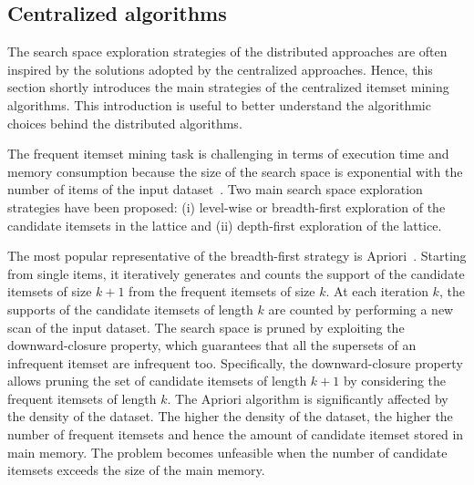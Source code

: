 \subsection{Centralized algorithms}
\label{centralized}
The search space exploration strategies of the distributed approaches are often inspired by the solutions adopted by the centralized approaches.
Hence, this section shortly introduces the main strategies of the centralized itemset mining algorithms. This introduction is useful to better understand the algorithmic choices behind the distributed algorithms.

The frequent itemset mining task is challenging in terms of execution time and memory consumption because the size of the search space is exponential with the number of items of the input dataset~\cite{goethals2003survey}.
Two main search space exploration strategies have been proposed: 
(i) level-wise or breadth-first exploration of the candidate itemsets in the lattice and 
(ii) depth-first exploration of the lattice.

The most popular representative of the breadth-first strategy is Apriori~\cite{apriori}. Starting from single items, it iteratively generates and counts the support of the candidate itemsets of size $k+1$ from the frequent itemsets of size $k$. At each iteration $k$, the supports of the candidate itemsets of length $k$ are counted by performing a new scan of the input dataset.
The search space is pruned by exploiting the downward-closure property, which guarantees that all the supersets of an infrequent itemset are infrequent
too. Specifically, the downward-closure property allows pruning the set of candidate itemsets of length $k+1$ by considering the 
frequent itemsets of length $k$.
The Apriori algorithm is significantly affected by the density of the dataset.
The higher the density of the dataset, the higher the number of frequent itemsets and hence the amount of candidate 
itemset stored in main memory. The problem becomes unfeasible when the number of candidate itemsets exceeds the size of the main memory.


